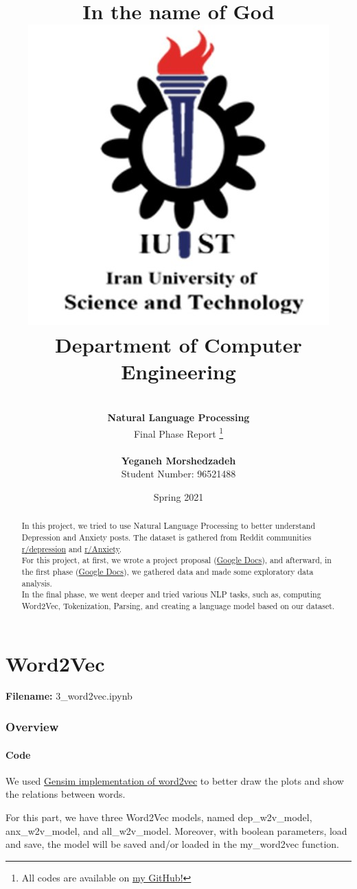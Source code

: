 \documentclass[12pt, a4paper]{article}
\title{
	{\Huge \textbf{In the name of God}}
	\\[20pt]
	\includegraphics[width=0.5\linewidth]{../assets/IUST_logo_color_eng.jpg} \\
	{\normalsize Department of Computer Engineering}
}
\author{
	\\[10pt]
	\textbf{{\LARGE Natural Language Processing}}
	\\[10pt]
	\LARGE Final Phase Report
	\thanks{All codes are available on \href{https://github.com/yegmor/NLPProject}{my GitHub!}}
	
	\\[30pt]
	\textbf{Yeganeh Morshedzadeh}
	\\[5pt]
	Student Number: 96521488
}
\date{Spring 2021}
\begin{document}
	
	\maketitle
	
	\clearpage
	\tableofcontents
	\newpage
	
	\listoffigures
	\newpage
	
	\listoftables
	\newpage
	
	\begin{abstract}
		In this project, we tried to use Natural Language Processing to better understand Depression and Anxiety posts. The dataset is gathered from Reddit communities \href{https://www.reddit.com/r/depression}{r/depression} and \href{https://www.reddit.com/r/Anxiety}{r/Anxiety}.
		\\[10pt]
		
		For this project, at first, we wrote a project proposal (\href{https://docs.google.com/document/d/1tHGEmEgn8-sp8MD72d8NjnZsq-GpVupzsMWgnqaGi-Y/edit?usp=sharing}{Google Docs}), and afterward, in the first phase (\href{https://docs.google.com/document/d/1Jc2ELhweU01Tbf0WalU7wVQABdAV4w50mhQnmMpU2mM/edit?usp=sharing}{Google Docs}), we gathered data and made some exploratory data analysis. 
		\\[10pt]
		
		In the final phase, we went deeper and tried various NLP tasks, such as, computing Word2Vec, Tokenization, Parsing, and creating a language model based on our dataset.
	\end{abstract}
	
	\newpage
	\part{Word2Vec}
	\large{\textbf{Filename:} 3\_word2vec.ipynb}
	\section{Overview}
	
	\subsection{Code}
	We used \href{https://radimrehurek.com/gensim/models/word2vec.html}{Gensim implementation of word2vec} to better draw the plots and show the relations between words. 
	
	For this part, we have three Word2Vec models, named dep\_w2v\_model, anx\_w2v\_model, and all\_w2v\_model. Moreover, with boolean parameters, load and save, the model will be saved and/or loaded in the my\_word2vec function.
	
\end{document}

